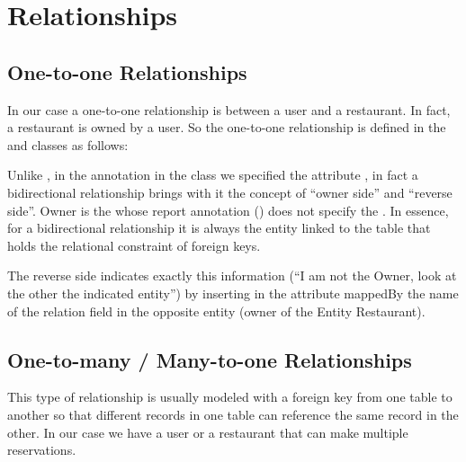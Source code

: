 \section{Relationships}

\subsection{One-to-one Relationships}

In our case a one-to-one relationship is between a user and a restaurant. In
fact, a restaurant is owned by a user. So the one-to-one relationship is defined
in the  and  classes as follows:





Unlike , in the annotation  in the 
class we specified the attribute , in fact a bidirectional
relationship brings with it the concept of ``owner side'' and ``reverse side''.
Owner is the  whose report annotation () does not
specify the .  In essence, for a bidirectional relationship it is
always the entity linked to the table that holds the relational constraint of
foreign keys.

The reverse side indicates exactly this information (``I am not the Owner, look
at the other the indicated entity'') by inserting in the attribute mappedBy the
name of the relation field in the opposite entity (owner of the Entity
Restaurant).

\subsection{One-to-many / Many-to-one Relationships}

This type of relationship is usually modeled with a foreign key from one table
to another so that different records in one table can reference the same record
in the other. In our case we have a user or a restaurant that can make multiple
reservations.





